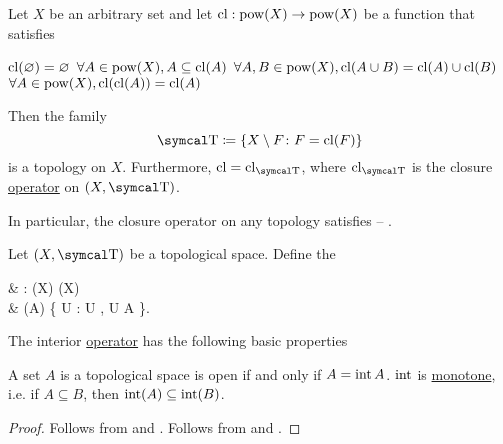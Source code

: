 \begin{proposition}\label{thm:closure_operator_axioms}
  Let \( X \) be an arbitrary set and let \( \operatorname{cl}: \operatorname{pow}(X) \to \operatorname{pow}(X) \) be a function that satisfies
  \begin{PropEnum}
     \( \operatorname{cl}(\varnothing) = \varnothing \)
     \( \forall A \in \operatorname{pow}(X), A \subseteq \operatorname{cl}(A) \)
     \( \forall A, B \in \operatorname{pow}(X), \operatorname{cl}(A \cup B) = \operatorname{cl}(A) \cup \operatorname{cl}(B) \)
     \( \forall A \in \operatorname{pow}(X), \operatorname{cl}(\operatorname{cl}(A)) = \operatorname{cl}(A) \)
  \end{PropEnum}

  Then the family
  \begin{equation*}
    \CT \coloneqq \{ X \setminus F \colon F = \Cl(F) \}
  \end{equation*}
  is a topology on \( X \). Furthermore, \( \Cl = \Cl_{\CT} \), where \( \Cl_{\CT} \) is the closure \hyperref[def:closure_operator]{operator} on \( (X, \CT) \).

  In particular, the closure operator on any topology satisfies  -- .
\end{proposition}

\begin{definition}\label{def:interior_operator}
  Let \( (X, \CT) \) be a topological space. Define the 
  \begin{BreakableAlign*}
     & \Int: \Pow(X) \to \Pow(X)                                     \\
     & \Int(A) \coloneqq \bigcup \{ U : U \in \CT, U \subseteq A \}.
  \end{BreakableAlign*}
\end{definition}

\begin{proposition}\label{thm:interior_operator_properties}
  The interior \hyperref[def:interior_operator]{operator} has the following basic properties
  \begin{PropEnum}
     A set \( A \) is a topological space is open if and only if \( A = \operatorname{int} A \).
     \( \operatorname{int} \) is \hyperref[def:monotone_map]{monotone}, i.e. if \( A \subseteq B \), then \( \operatorname{int}(A) \subseteq \operatorname{int}(B) \).
  \end{PropEnum}
\end{proposition}
\begin{proof}
   Follows from  and .
   Follows from  and .
\end{proof}

